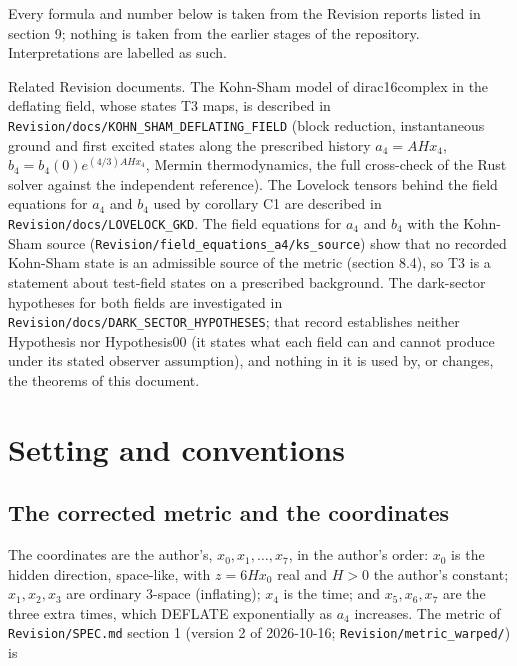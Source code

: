 \documentclass[11pt]{article}
\begin{document}
Every formula and number below is taken from the Revision reports listed in section 9; nothing is taken from the earlier stages of the repository. Interpretations are labelled as such.

Related Revision documents. The Kohn-Sham model of dirac16complex in the deflating field, whose states T3 maps, is described in \texttt{Revision\allowbreak{}/docs/KO\allowbreak{}HN\_SHAM\_\allowbreak{}DEFLATIN\allowbreak{}G\_FIELD} (block reduction, instantaneous ground and first excited states along the prescribed history $a_4 = AHx_4$, $b_4 = b_4(0)e^{(4/3)AHx_4}$, Mermin thermodynamics, the full cross-check of the Rust solver against the independent reference). The Lovelock tensors behind the field equations for $a_4$ and $b_4$ used by corollary C1 are described in \texttt{Revision\allowbreak{}/docs/LO\allowbreak{}VELOCK\_G\allowbreak{}KD}. The field equations for $a_4$ and $b_4$ with the Kohn-Sham source (\texttt{Revision\allowbreak{}/field\_e\allowbreak{}quations\allowbreak{}\_a4/ks\_s\allowbreak{}ource}) show that no recorded Kohn-Sham state is an admissible source of the metric (section 8.4), so T3 is a statement about test-field states on a prescribed background. The dark-sector hypotheses for both fields are investigated in \texttt{Revision\allowbreak{}/docs/DA\allowbreak{}RK\_SECTO\allowbreak{}R\_HYPOTH\allowbreak{}ESES}; that record establishes neither Hypothesis nor Hypothesis00 (it states what each field can and cannot produce under its stated observer assumption), and nothing in it is used by, or changes, the theorems of this document.

\section{Setting and conventions}

\subsection{The corrected metric and the coordinates}

The coordinates are the author's, $x_0, x_1, \dots, x_7$, in the author's order: $x_0$ is the hidden direction, space-like, with $z = 6Hx_0$ real and $H > 0$ the author's constant; $x_1, x_2, x_3$ are ordinary 3-space (inflating); $x_4$ is the time; and $x_5, x_6, x_7$ are the three extra times, which DEFLATE exponentially as $a_4$ increases. The metric of \texttt{Revision\allowbreak{}/SPEC.md} section 1 (version 2 of 2026-10-16; \texttt{Revision\allowbreak{}/metric\_\allowbreak{}warped/}) is
\end{document}
